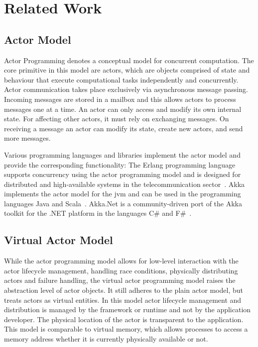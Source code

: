 
\section{Related Work}

  \subsection{Actor Model}
  Actor Programming denotes a conceptual model for concurrent computation.
  The core primitive in this model are actors, which are objects comprised of state and behaviour that execute computational tasks independently and concurrently.
  Actor communication takes place exclusively via asynchronous message passing.
  Incoming messages are stored in a mailbox and this allows actors to process messages one at a time.
  An actor can only access and modify its own internal state.
  For affecting other actors, it must rely on exchanging messages.
  On receiving a message an actor can modify its state, create new actors, and send more messages.

  Various programming languages and libraries implement the actor model and provide the corresponding functionality:
  The Erlang programming language supports concurrency using the actor programming model and is designed for distributed and high-available systems in the telecommunication sector~\cite{armstrong:erlang}.
  Akka implements the actor model for the \gls{jvm} and can be used in the programming languages Java and Scala~\cite{akka}.
  Akka.Net is a community-driven port of the Akka toolkit for the .NET platform in the languages C\# and F\#~\cite{akka.net}.

  \subsection{Virtual Actor Model}
  While the actor programming model allows for low-level interaction with the actor lifecycle management, handling race conditions, physically distributing actors and failure handling, the virtual actor programming model raises the abstraction level of actor objects.
  It still adheres to the plain actor model, but treats actors as virtual entities.
  In this model actor lifecycle management and distribution is managed by the framework or runtime and not by the application developer.
  The physical location of the actor is transparent to the application.
  This model is comparable to virtual memory, which allows processes to access a memory address whether it is currently physically available or not.
  
